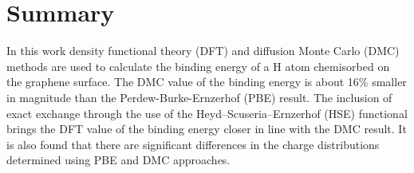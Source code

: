 \section{Summary}
In this work density functional theory (DFT) and diffusion Monte Carlo (DMC) methods are used to calculate the binding energy of a H atom chemisorbed on the graphene surface.
The DMC value of the binding energy is about 16\% smaller in magnitude than the Perdew-Burke-Ernzerhof (PBE) result.
The inclusion of exact exchange through the use of the Heyd–Scuseria–Ernzerhof (HSE) functional brings the DFT value of the binding energy closer in line with the DMC result.
It is also found that there are significant differences in the charge distributions determined using PBE and DMC approaches.

